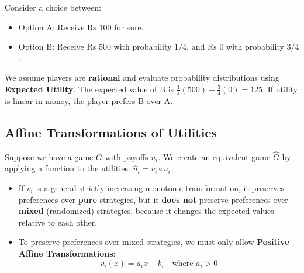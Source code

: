 \documentclass[12pt, a4paper]{article}
\begin{document}
Consider a choice between:
\begin{itemize}
    \item Option A: Receive Rs 100 for sure.
    \item Option B: Receive Rs 500 with probability $1/4$, and Rs 0 with probability $3/4$.
\end{itemize}
We assume players are \textbf{rational} and evaluate probability distributions using \textbf{Expected Utility}.
The expected value of B is $\frac{1}{4}(500) + \frac{3}{4}(0) = 125$. If utility is linear in money, the player prefers B over A.

\subsection{Affine Transformations of Utilities}
Suppose we have a game $G$ with payoffs $u_i$. We create an equivalent game $\hat{G}$ by applying a function to the utilities: $\hat{u}_i = v_i \circ u_i$.
\begin{itemize}
    \item If $v_i$ is a general strictly increasing monotonic transformation, it preserves preferences over \textbf{pure} strategies, but it \textbf{does not} preserve preferences over \textbf{mixed} (randomized) strategies, because it changes the expected values relative to each other.
    \item To preserve preferences over mixed strategies, we must only allow \textbf{Positive Affine Transformations}:
    \[
      v_i(x) = a_i x + b_i \quad \text{where } a_i > 0
    \]
\end{itemize}
\end{document}
